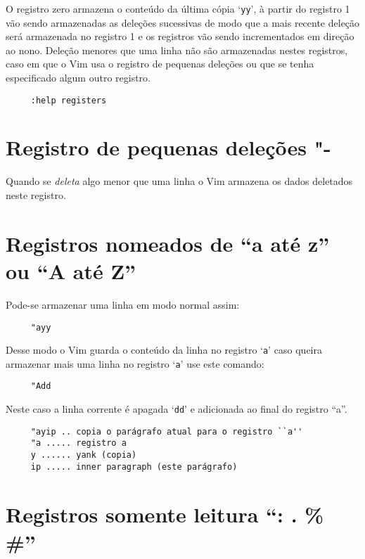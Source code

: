 O registro zero armazena o conteúdo da última cópia `{\tt yy}', à partir do
registro 1 vão sendo armazenadas as deleções sucessivas de modo que a
mais recente deleção será armazenada no registro 1 e os registros vão
sendo incrementados em direção ao nono.  Deleção menores que uma linha
não são armazenadas nestes registros, caso em que o Vim usa o registro
de pequenas deleções ou que se tenha especificado algum outro
registro.

\begin{verbatim}
     :help registers
\end{verbatim}

\section{Registro de pequenas deleções "-}
\label{Registro de pequenas deleções "-}

Quando se {\em deleta} algo menor que uma linha o Vim armazena os dados
deletados neste registro.

\section{Registros nomeados de ``a até z'' ou ``A até Z''}
\label{Registros nomeados de ``a até z'' ou ``A até Z''}
Pode-se armazenar uma linha em modo normal assim:

\begin{verbatim}
     "ayy
\end{verbatim}

Desse modo o Vim guarda o conteúdo da linha no registro `{\tt a}' caso
queira armazenar mais uma linha no registro `{\tt a}' use este comando:

\begin{verbatim}
     "Add
\end{verbatim}

Neste caso a linha corrente é apagada `{\tt dd}' e  adicionada ao final do
registro ``a''.

\begin{verbatim}
     "ayip .. copia o parágrafo atual para o registro ``a''
     "a ..... registro a
     y ...... yank (copia)
     ip ..... inner paragraph (este parágrafo)
\end{verbatim}

\section{Registros somente leitura ``: . \% \#''}
\label{Registros somente leitura}

